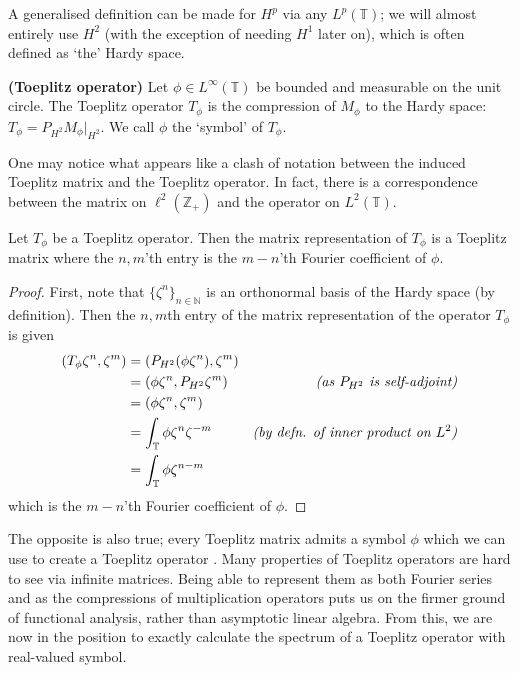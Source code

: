 \documentclass[../main.tex]{subfiles}
\begin{document}
A generalised definition can be made for $H^p$ via any $L^p(\mathbb{T})$; we
will almost entirely use $H^2$ (with the exception of needing $H^1$ later on),
which is often defined as `the' Hardy space.

\begin{definition}{\textbf{(Toeplitz operator)}}
  Let $\phi \in L^{\infty}(\mathbb{T})$ be bounded and measurable on the unit
  circle. The Toeplitz operator $T_\phi$ is the compression of $M_\phi$ to
  the Hardy space: $T_{\phi} = P_{H^2} M_\phi \big|_{H^2}$. We call $\phi$
  the `symbol' of $T_\phi$.
\end{definition}

One may notice what appears like a clash of notation between the induced
Toeplitz matrix and the Toeplitz operator. In fact, there is a correspondence
between the matrix on $\ell^2(\mathbb{Z}_+)$ and the operator on $L^2(\mathbb{T})$.

\begin{theorem}
  Let $T_\phi$ be a Toeplitz operator. Then the matrix representation of $T_\phi$
  is a Toeplitz matrix where the $n,m$'th entry is the $m-n$'th Fourier coefficient
  of $\phi$.
\end{theorem}
\begin{proof}\cite{garcia2023operator}
First, note that $\{\zeta^n\}_{n\in\mathbb{N}}$ is an orthonormal basis of
the Hardy space (by definition).
Then the $n,m$th entry of the matrix representation of the operator $T_\phi$ is given
  \begin{align*}
    (T_{\phi}\zeta^n, \zeta^m) & = (P_{H^2}(\phi\zeta^n), \zeta^m) & \\
                               & = (\phi\zeta^n, P_{H^2}\zeta^m) 
                                 & \text{\emph{(as $P_{H^2}$ is self-adjoint)}} \\
                               & = (\phi\zeta^n, \zeta^m) &\\
                               & = \int_{\mathbb{T}} \phi\zeta^n \zeta^{-m}
                                 & \text{\emph{(by defn. of inner product on $L^2$)}}\\
                               & = \int_{\mathbb{T}} \phi \zeta^{n-m} &\\
  \end{align*}
which is the $m-n$'th Fourier coefficient of $\phi$.
\end{proof}
The opposite is also true; every Toeplitz matrix admits a symbol $\phi$ which
we can use to create a Toeplitz operator \cite{garcia2023operator}.
Many properties of Toeplitz operators are hard to see via infinite matrices.
Being able to represent them as both Fourier series and as the  compressions of
multiplication operators puts us on the firmer ground of functional analysis,
rather than asymptotic linear algebra. From this, we
are now in the position to exactly calculate the spectrum of a Toeplitz operator
with real-valued symbol.
\end{document}

